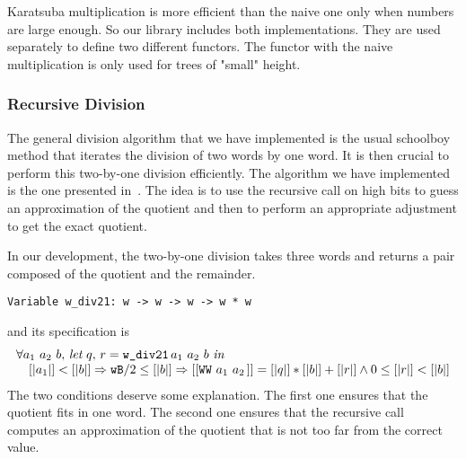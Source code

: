 Karatsuba multiplication is more efficient than the naive one
only when numbers are large enough. So our library
includes both implementations. They are used separately to define two
different functors. The functor with the naive multiplication is only used 
for trees of "small" height. 

\subsubsection{Recursive Division}
The general division algorithm that we have implemented is the usual schoolboy 
method that iterates the division of two words by one word. 
It is then crucial to perform this two-by-one division efficiently. 
The algorithm we have implemented is the one presented in~\cite{RecDiv}.
The idea is to use the recursive call on high bits to guess an approximation 
of the quotient and  then to perform an appropriate adjustment to get the exact quotient.

In our development, the two-by-one division takes
three words and returns a pair composed of the quotient and the remainder.
\begin{verbatim}
Variable w_div21: w -> w -> w -> w * w
\end{verbatim}
and its specification is 
$$\begin{array}{l}
\forall a_1\,\, a_2\,\, b,\, \textit{let}\,\, q,\, r = \texttt{w\_div21}\, a_1\,\, a_2\,\, b\,\, \textit{in}\,\, \\
\hskip10pt [|a_1|] < [|b|] \Rightarrow {\texttt{wB}} / 2 \le [|b|] \Rightarrow  [[\texttt{WW}\,\,a_1\,\,a_2\,]] = [|q|] * [|b|] + [|r|] \land 0 \le [|r|] < [|b|]
\end{array}
$$
The two conditions deserve some explanation.
The first one ensures that the quotient fits in one word.
The second one %
ensures that the recursive call computes an approximation 
of the quotient that is not too far from the correct value.

